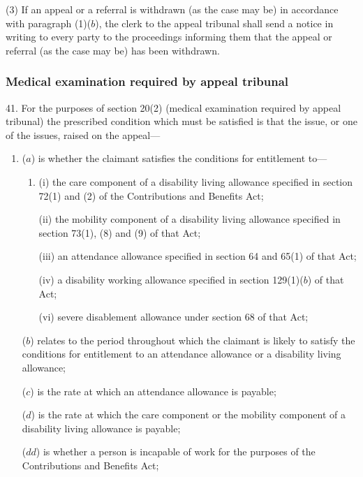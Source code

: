 \documentclass[12pt,a4paper]{article}
\begin{document}
(3) If an appeal or a referral is withdrawn (as the case may be) in accordance with paragraph (1)($b$), the clerk to the appeal tribunal shall send a notice in writing to every party to the proceedings informing them that the appeal or referral (as the case may be) has been withdrawn.

\subsubsection[41. Medical examination required by appeal tribunal]
{Medical examination required by appeal tribunal}

41.  For the purposes of section 20(2) (medical examination required by appeal tribunal) the prescribed condition which must be satisfied is that the issue, or one of the issues, raised on the appeal—
\begin{enumerate}\item[]
($a$) is whether the claimant satisfies the conditions for entitlement to—
\begin{enumerate}\item[]
(i) the care component of a disability living allowance specified in section 72(1) and (2) of the Contributions and Benefits Act;

(ii) the mobility component of a disability living allowance specified in section 73(1), (8) and (9) of that Act;

(iii) an attendance allowance specified in section 64 and 65(1) of that Act;

(iv) a disability working allowance specified in section 129(1)($b$) of that Act;


(vi) severe disablement allowance under section 68 of that Act;
\end{enumerate}

($b$) relates to the period throughout which the claimant is likely to satisfy the conditions for entitlement to an attendance allowance or a disability living allowance;

($c$) is the rate at which an attendance allowance is payable;

($d$) is the rate at which the care component or the mobility component of a disability living allowance is payable;

($dd$) is whether a person is incapable of work for the purposes of the Contributions and Benefits Act;


\end{enumerate}
\end{document}
